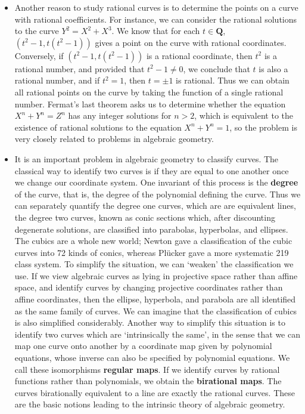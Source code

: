 \begin{itemize}
    \item Another reason to study rational curves is to determine the points on a curve with rational coefficients. For instance, we can consider the rational solutions to the curve $Y^2 = X^2 + X^3$. We know that for each $t \in \mathbf{Q}$, $(t^2 - 1, t(t^2 - 1))$ gives a point on the curve with rational coordinates. Conversely, if $(t^2 - 1, t(t^2 - 1))$ is a rational coordinate, then $t^2$ is a rational number, and provided that $t^2 - 1 \neq 0$, we conclude that $t$ is also a rational number, and if $t^2 = 1$, then $t = \pm 1$ is rational. Thus we can obtain all rational points on the curve by taking the function of a single rational number. Fermat's last theorem asks us to determine whether the equation $X^n + Y^n = Z^n$ has any integer solutions for $n > 2$, which is equivalent to the existence of rational solutions to the equation $X^n + Y^n = 1$, so the problem is very closely related to problems in algebraic geometry.

    \item It is an important problem in algebraic geometry to classify curves. The classical way to identify two curves is if they are equal to one another once we change our coordinate system. One invariant of this process is the {\bf degree} of the curve, that is, the degree of the polynomial defining the curve. Thus we can separately quantify the degree one curves, which are are equivalent lines, the degree two curves, known as conic sections which, after discounting degenerate solutions, are classified into parabolas, hyperbolas, and ellipses. The cubics are a whole new world; Newton gave a classification of the cubic curves into 72 kinds of conics, whereas Pl\"{u}cker gave a more systematic 219 class system. To simplify the situation, we can `weaken' the classification we use. If we view algebraic curves as lying in projective space rather than affine space, and identify curves by changing projective coordinates rather than affine coordinates, then the ellipse, hyperbola, and parabola are all identified as the same family of curves. We can imagine that the classification of cubics is also simplified considerably. Another way to simplify this situation is to identify two curves which are `intrinsically the same', in the sense that we can map one curve onto another by a coordinate map given by polynomial equations, whose inverse can also be specified by polynomial equations. We call these isomorphisms {\bf regular maps}. If we identify curves by rational functions rather than polynomials, we obtain the {\bf birational maps}. The curves birationally equivalent to a line are exactly the rational curves. These are the basic notions leading to the intrinsic theory of algebraic geometry.
\end{itemize}

